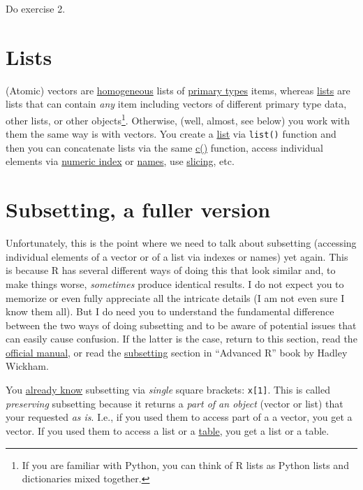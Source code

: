 \documentclass[
]{book}
\begin{document}
Do exercise 2.

\hypertarget{lists}{%
\section{Lists}\label{lists}}

(Atomic) vectors are \protect\hyperlink{vectors-are-homogeneous}{homogeneous} lists of \protect\hyperlink{primary-types}{primary types} items, whereas \href{https://stat.ethz.ch/R-manual/R-devel/library/base/html/list.html}{lists} are lists that can contain \emph{any} item including vectors of different primary type data, other lists, or other objects\footnote{If you are familiar with Python, you can think of R lists as Python lists and dictionaries mixed together.}. Otherwise, (well, almost, see below) you work with them the same way is with vectors. You create a \href{https://stat.ethz.ch/R-manual/R-devel/library/base/html/list.html}{list} via \texttt{list()} function and then you can concatenate lists via the same \href{(https://stat.ethz.ch/R-manual/R-devel/library/base/html/c.html)}{c()} function, access individual elements via \protect\hyperlink{vector-index}{numeric index} or \protect\hyperlink{names}{names}, use \protect\hyperlink{vector-index-slicing}{slicing}, etc.

\hypertarget{subsetting}{%
\section{Subsetting, a fuller version}\label{subsetting}}

Unfortunately, this is the point where we need to talk about subsetting (accessing individual elements of a vector or of a list via indexes or names) yet again. This is because R has several different ways of doing this that look similar and, to make things worse, \emph{sometimes} produce identical results. I do not expect you to memorize or even fully appreciate all the intricate details (I am not even sure I know them all). But I do need you to understand the fundamental difference between the two ways of doing subsetting and to be aware of potential issues that can easily cause confusion. If the latter is the case, return to this section, read the \href{https://stat.ethz.ch/R-manual/R-devel/library/base/html/Extract.html}{official manual}, or read the \href{http://adv-r.had.co.nz/Subsetting.html}{subsetting} section in ``Advanced R'' book by Hadley Wickham.

You \protect\hyperlink{vector-index}{already know} subsetting via \emph{single} square brackets: \texttt{x{[}1{]}}. This is called \emph{preserving} subsetting because it returns a \emph{part of an object} (vector or list) that your requested \emph{as is}. I.e., if you used them to access part of a a vector, you get a vector. If you used them to access a list or a \protect\hyperlink{data.frame}{table}, you get a list or a table.
\end{document}
